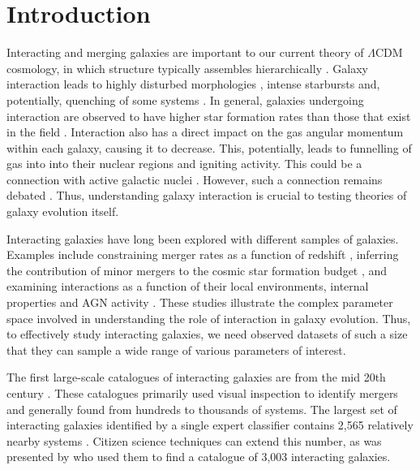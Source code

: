 \section{Introduction}\label{intro}
\noindent Interacting and merging galaxies are important to our current theory of $\Lambda$CDM cosmology, in which structure typically assembles hierarchically \citep{2003ApJ...597...21A, 2005Natur.435..629S, 2007MNRAS.375....2D, 2008MNRAS.384....2G}. Galaxy interaction leads to highly disturbed morphologies \citep{1972ApJ...178..623T, 2005AJ....129..682H, 2016A&C....16...26W}, intense starbursts \citep{1996ApJ...464..641M, 2000MNRAS.312..859S, 2009PASJ...61..481S, 2021MNRAS.503.3113M} and, potentially, quenching of some systems \citep{2013MNRAS.430.1901H, 2018MNRAS.473.2679S, 2020MNRAS.493.3716H, 2023RAA....23i5026D}. In general, galaxies undergoing interaction are observed to have higher star formation rates than those that exist in the field \citep{2008AJ....135.1877E, 2012MNRAS.426..549S, 2019A&A...631A..51P}. Interaction also has a direct impact on the gas angular momentum within each galaxy, causing it to decrease. This, potentially, leads to funnelling of gas into into their nuclear regions and igniting activity. This could be a connection with active galactic nuclei \citep{2008AJ....135.1877E, li08, 2011MNRAS.418.2043E, 2015ApJ...806..219C}. However, such a connection remains debated \citep{2007MNRAS.375.1017A, 2010MNRAS.407.2399M, 2020ApJ...904...79M}. Thus, understanding galaxy interaction is crucial to testing theories of galaxy evolution itself.

Interacting galaxies have long been explored with different samples of galaxies. Examples include constraining merger rates as a function of redshift \citep{2008ApJ...672..177L}, inferring the contribution of minor mergers to the cosmic star formation budget \citep{2014MNRAS.440.2944K, 2014MNRAS.437L..41K}, and examining interactions as a function of their local environments, internal properties and AGN activity \citep{2010MNRAS.401.1552D}. These studies \citep[and many others; for further examples, see][]{2000ApJ...530..660B, 2004MNRAS.352.1081A, 2013MNRAS.435.3627E, 2016MNRAS.459..720H, 2021ApJ...909..124S} illustrate the complex parameter space involved in understanding the role of interaction in galaxy evolution. Thus, to effectively study interacting galaxies, we need observed datasets of such a size that they can sample a wide range of various parameters of interest.

The first large-scale catalogues of interacting galaxies are from the mid 20th century \citep[][hereafter VV]{1966ApJS...14....1A, 1959VV....C......0V, 1977A&AS...28....1V}. These catalogues primarily used visual inspection to identify mergers \citep[e.g.,][]{1997ApJS..108...99D, 2010ApJS..186..427N} and generally found from hundreds to thousands of systems. The largest set of interacting galaxies identified by a single expert classifier contains 2,565 relatively nearby systems \citep{1987cspg.book.....A}. Citizen science techniques can extend this number, as was presented by \citet{2010MNRAS.401.1552D} who used them to find a catalogue of 3,003 interacting galaxies.

